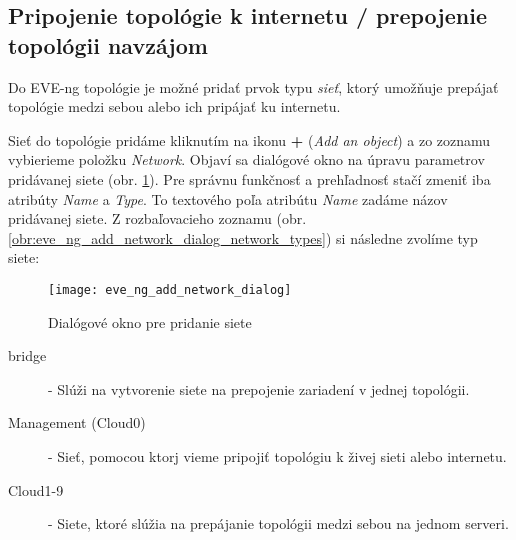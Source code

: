\begin{comment}
\begin{figure}
    \centering
    \texttt{[image: eve\_ng\_rovnaka\_topo\_prvy\_pouzivatel\_admin]}
    \caption{Topológia prvého používateľa s používateľskou rolou \emph{admin}}
    \label{obr:eve_ng_rovnaka_topo_prvy_pouzivatel_admin}
\end{figure}

\begin{figure}
    \centering
    \texttt{[image: eve\_ng\_rovnaka\_topo\_druhy\_pouzivatel\_editor]}
    \caption{Topológia druhého používateľa s používateľskou rolou \emph{editor}}
    \label{obr:eve_ng_rovnaka_topo_druhy_pouzivatel_editor}
\end{figure}
\end{comment}



\subsection{Pripojenie topológie k internetu / prepojenie topológii navzájom}

Do EVE-ng topológie je možné pridať prvok typu \emph{sieť}, ktorý umožňuje prepájať topológie medzi sebou alebo ich pripájať ku internetu.

Sieť do topológie pridáme kliknutím na ikonu \textbf{+} (\emph{Add an object}) a zo zoznamu vybierieme položku \emph{Network}. Objaví sa dialógové okno na úpravu parametrov pridávanej siete (obr. \ref{obr:eve_ng_add_network_dialog}). Pre správnu funkčnosť a prehľadnosť stačí zmeniť iba atribúty \emph{Name} a \emph{Type}. To textového poľa atribútu \emph{Name} zadáme názov pridávanej siete. Z rozbaľovacieho zoznamu (obr. \ref{obr:eve_ng_add_network_dialog_network_types}) si následne zvolíme typ siete:

\begin{figure}
    \centering
    \texttt{[image: eve\_ng\_add\_network\_dialog]}
    \caption{Dialógové okno pre pridanie siete}
    \label{obr:eve_ng_add_network_dialog}
\end{figure}

\begin{description}
    \item [bridge] - Slúži na vytvorenie siete na prepojenie zariadení v jednej topológii.
    \item [Management (Cloud0)] - Sieť, pomocou ktorj vieme pripojiť topológiu k živej sieti alebo internetu.
    \item [Cloud1-9] - Siete, ktoré slúžia na prepájanie topológii medzi sebou na jednom serveri.
\end{description}

